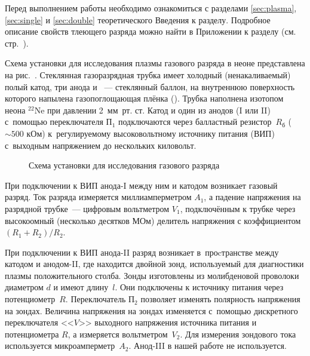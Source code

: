 


Перед выполнением работы необходимо ознакомиться с разделами
\ref{sec:plasma}, \ref{sec:single} и \ref{sec:double} теоретического Введения
к разделу.
Подробное описание свойств тлеющего разряда можно найти в Приложении к разделу
(см. стр.~\pageref{sec:discharge}).

Схема установки для исследования плазмы газового разряда в неоне представлена на
рис.~. Стеклянная газоразрядная
трубка имеет холодный (ненакаливаемый) полый катод, три анода и
~--- стеклянный баллон, на
внутреннюю поверхность которого напылена газопоглощающая плёнка
(). Трубка наполнена изотопом неона
$^{22}$Ne при давлении 2~мм~рт. ст. Катод и один из анодов (I или II) с~помощью
переключателя $\text{П}_1$ подключаются через
балластный резистор~$R_\text{б}$ ($\sim500$ кОм) к~регулируемому высоковольтному
источнику питания (ВИП) с~выходным
напряжением до нескольких киловольт.

\begin{figure}[h!]
    \centering
    \footnotesize
	\caption{Схема установки для исследования газового разряда}
\end{figure}

При подключении к ВИП анода-I между ним и катодом возникает газовый разряд. Ток
разряда измеряется миллиамперметром
$A_1$, а падение напряжения на разрядной трубке~--- цифровым вольтметром
$V_{1}$, подключённым к трубке через
высокоомный (несколько десятков МОм) делитель напряжения с коэффициентом
$(R_1+R_2)/R_2$.

При подключении к ВИП анода-II разряд возникает в~проcтранстве между катодом и
анодом-II, где находится двойной зонд,
используемый для диагностики плазмы положительного столба. Зонды изготовлены из
молибденовой проволоки диаметром
$d$ и имеют длину~$l$. Они подключены к источнику питания через
потенциометр~$R$. Переключатель
$\text{П}_2$ позволяет изменять полярность напряжения на зондах. Величина
напряжения на зондах изменяется с~помощью дискретного
переключателя <<$V$>> выходного напряжения источника питания и потенциометра
$R$, а измеряется вольтметром~$V_2$. Для
измерения зондового тока используется микроамперметр~$A_2$.
Анод-III в нашей работе не используется.

